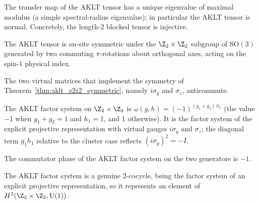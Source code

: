 \begin{theorem}\label{thm:aklt_normal}
    \leanok
    The transfer map of the AKLT tensor has a unique eigenvalue of
    maximal modulus (a simple spectral-radius eigenvalue); in
    particular the AKLT tensor is normal. Concretely, the
    length-$2$ blocked tensor is injective.
\end{theorem}

\begin{theorem}\label{thm:aklt_z2z2_symmetric}
    \leanok
    The AKLT tensor is on-site symmetric under the $\Z_2 \times \Z_2$ subgroup
    of $\mathrm{SO}(3)$ generated by two commuting $\pi$-rotations about
    orthogonal axes, acting on the spin-$1$ physical index.
\end{theorem}

\begin{theorem}\label{thm:aklt_gauge_anticomm}
    \leanok
    The two virtual matrices that implement the symmetry of
    Theorem~\ref{thm:aklt_z2z2_symmetric}, namely $i\sigma_y$ and $\sigma_z$,
    anticommute.
\end{theorem}

\begin{definition}\label{def:aklt_omega}
    \leanok
    The AKLT factor system on $\Z_2 \times \Z_2$ is
    $\omega(g,h) = (-1)^{(g_1 + g_2)\,h_1}$ (the value $-1$ when $g_1 + g_2 = 1$
    and $h_1 = 1$, and $1$ otherwise).  It is the factor system of the explicit
    projective representation with virtual gauges $i\sigma_y$ and $\sigma_z$; the
    diagonal term $g_1 h_1$ relative to the cluster case reflects
    $(i\sigma_y)^2 = -I$.
\end{definition}

\begin{lemma}\label{lem:aklt_comm_phase_neg_one}
    \leanok
    The commutator phase of the AKLT factor system on the two generators is $-1$.
\end{lemma}

\begin{theorem}\label{thm:aklt_omega_cocycle}
    \leanok
    The AKLT factor system is a genuine $2$-cocycle, being the factor system of an
    explicit projective representation, so it represents an element of
    $H^2(\Z_2 \times \Z_2, \mathrm{U}(1))$.
\end{theorem}

